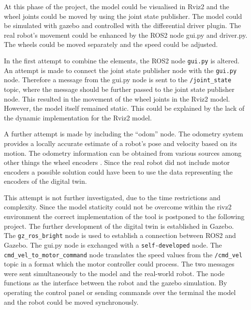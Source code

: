 At this phase of the project, the model could be visualised in Rviz2 and the wheel joints could be moved by using the joint state publisher. The model could be simulated with gazebo and controlled with the differential driver plugin. The real robot's movement could be enhanced by the ROS2 node gui.py and driver.py. The wheels could be moved separately and the speed could be adjusted.

In the first attempt to combine the elements, the ROS2 node \verb|gui.py| is altered. An attempt is made to connect the joint state publisher node with the \verb|gui.py| node. Therefore a message from the gui.py node is sent to the \verb|/joint_state| topic, where the message should be further passed to the joint state publisher node. This resulted in the movement of the wheel joints in the Rviz2 model. However, the model itself remained static. This could be explained by the lack of the dynamic implementation for the 
Rviz2 model. 

A further attempt is made by including the ``odom'' node. The odometry system %
provides a locally accurate estimate of a robot's pose and velocity based on its motion. The odometry information can be obtained from various sources among other things the wheel encoders \autocite{SettingOdometryNav2}. Since the real robot did not include motor encoders a possible solution could have been to use the data representing the encoders of the digital twin. 



This attempt is not further investigated, due to the time restrictions and complexity. Since the model staticity could not be overcome within the rivz2 environment the correct implementation of the tool is postponed to the following project. The further development of the digital twin is established in Gazebo. The \verb|gz_ros_bright| node is used to establish a connection between ROS2 and Gazebo. The gui.py node is exchanged with a \verb|self-developed| node. The \verb|cmd_vel_to_motor_command| node translates the speed values from the \verb|/cmd_vel| topic in a format which the motor controller could process. The two messages were sent simultaneously to the model and the real-world robot. The node functions as the interface between the robot and the gazebo simulation. By operating the control panel or sending commands over the terminal the model and the robot could be moved synchronously.

